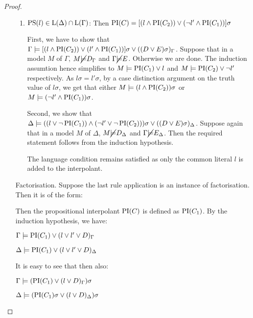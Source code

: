 \begin{proof}
\begin{itemize}
\begin{enumerate}
				\item $\operatorname{PS}(l) \in \operatorname{L}(\Delta) \cap \operatorname{L}(\Gamma)$:
					Then $\operatorname{PI}(C) = [(l \land \operatorname{PI}(C_2)) \lor (\lnot l' \land \operatorname{PI}(C_1)) ]\sigma $

					First, we have to show that 
					$ \Gamma \models [(l \land \operatorname{PI}(C_2)) \lor (l' \land \operatorname{PI}(C_1)) ]\sigma \lor ((D \lor E)\sigma)_\Gamma$.
					Suppose that in a model $M$ of $\Gamma$, $M \cancel {\models} D_\Gamma$ and $\Gamma \cancel {\models} E$. Otherwise we are done.
					The induction assumtion hence simplifies to $M \models \operatorname{PI}(C_1) \lor l$ and $M \models \operatorname{PI}(C_2) \lor \lnot l'$ respectively.
					As $l\sigma = l'\sigma$, by a case distinction argument on the truth value of $l\sigma$, we get that either $M \models (l \land \operatorname{PI}(C_2))\sigma$ or $M \models  (\lnot l' \land \operatorname{PI}(C_1))\sigma$.


					Second, we show that 
					$\Delta \models ((l \lor \lnot \operatorname{PI}(C_1)) \land (\lnot l' \lor \lnot \operatorname{PI}(C_2)))\sigma \lor ((D \lor E)\sigma)_\Delta$.
					Suppose again that in a model $M$ of $\Delta$, $M \cancel {\models} D_\Delta$ and $\Gamma \cancel {\models} E_\Delta$. 
					Then the required statement follows from the induction hypothesis.
					
					The language condition remains satisfied as only the common literal $l$ is added to the interpolant.


			\end{enumerate}

		\item[Factorisation.]	
			Suppose the last rule application is an instance of factorisation. Then it is of the form:
			\begin{prooftree}
			\end{prooftree}

			Then the propositional interpolant $\operatorname{PI}(C)$ is defined as $\operatorname{PI}(C_1)$.
			By the induction hypothesis, we have:

			$\Gamma \models \operatorname{PI}(C_1) \lor (l \lor l' \lor D)_\Gamma$

			$\Delta \models \operatorname{PI}(C_1) \lor (l \lor l' \lor D)_\Delta$

			It is easy to see that then also:

			$\Gamma \models (\operatorname{PI}(C_1)\lor (l \lor D)_\Gamma)\sigma$

			$\Delta \models (\operatorname{PI}(C_1)\sigma \lor (l \lor D)_\Delta)\sigma$


\end{itemize}
\end{proof}
